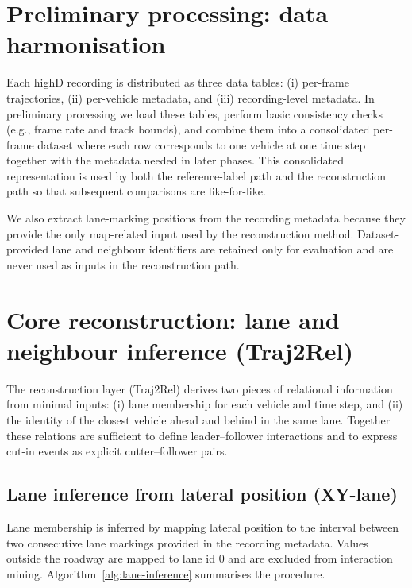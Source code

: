 \documentclass[12pt,a4paper,twoside,openright]{report}
\begin{document}
    \section{Preliminary processing: data harmonisation}
    Each highD recording is distributed as three data tables: (i) per-frame trajectories, (ii) per-vehicle metadata, and (iii) recording-level metadata. In preliminary processing we load these tables, perform basic consistency checks (e.g., frame rate and track bounds), and combine them into a consolidated per-frame dataset where each row corresponds to one vehicle at one time step together with the metadata needed in later phases. This consolidated representation is used by both the reference-label path and the reconstruction path so that subsequent comparisons are like-for-like.

    We also extract lane-marking positions from the recording metadata because they provide the only map-related input used by the reconstruction method. Dataset-provided lane and neighbour identifiers are retained only for evaluation and are never used as inputs in the reconstruction path.

    \section{Core reconstruction: lane and neighbour inference (Traj2Rel)}
    The reconstruction layer (Traj2Rel) derives two pieces of relational information from minimal inputs: (i) lane membership for each vehicle and time step, and (ii) the identity of the closest vehicle ahead and behind in the same lane. Together these relations are sufficient to define leader--follower interactions and to express cut-in events as explicit cutter--follower pairs.

    \subsection{Lane inference from lateral position (XY-lane)}
    Lane membership is inferred by mapping lateral position to the interval between two consecutive lane markings provided in the recording metadata. Values outside the roadway are mapped to lane id 0 and are excluded from interaction mining. Algorithm~\ref{alg:lane-inference} summarises the procedure.

    \begin{algorithm}[t]
\caption{Lane inference from lateral position and lane markings}
\label{alg:lane-inference}

\ForEach{frame $t$}{
    \If{$y(t) \notin [b_0, b_K)$}{
        $\ell(t) \leftarrow 0$\tcp*{outside valid lanes}
    }
    \Else{
        find $k$ such that $b_{k-1} \le y(t) < b_k$\;
        $\ell(t) \leftarrow k$\;
    }
}
    \end{algorithm}
\end{document}
